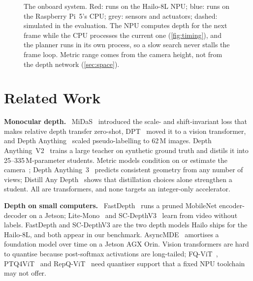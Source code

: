 \documentclass[conference]{IEEEtran}
\newcommand{\hailo}{Hailo-8L}
\newcommand{\rpi}{Raspberry Pi~5}
\newcommand{\dav}{Depth Anything~V2}
\newcommand{\keyline}[1]{\smallskip\noindent\textbf{#1}\ }
\begin{document}
\begin{figure}[t]
\caption{The onboard system. Red: runs on the \hailo{} NPU; blue: runs on the \rpi{}'s CPU; grey: sensors and actuators; dashed: simulated in the evaluation. The
NPU computes depth for the next frame while the CPU processes the current one (\cref{fig:timing}), and the planner runs in its
own process, so a slow search never stalls the frame loop. Metric range comes from the camera height, not from the depth
network (\cref{sec:space}).}
\label{fig:system}
\end{figure}

\section{Related Work}
\keyline{Monocular depth.} MiDaS~\cite{ranftl2022midas} introduced the scale- and shift-invariant loss that makes relative
depth transfer zero-shot, DPT~\cite{ranftl2021dpt} moved it to a vision transformer, and Depth Anything~\cite{yang2024da1}
scaled pseudo-labelling to 62\,M images. \dav{}~\cite{yang2024dav2} trains a large teacher on synthetic ground truth and
distils it into 25--335\,M-parameter students. Metric models condition on or estimate the camera~\cite{hu2024metric3dv2,
piccinelli2024unidepth,bochkovskiy2025depthpro}; Depth Anything~3~\cite{lin2025da3} predicts consistent geometry from any
number of views; Distill Any Depth~\cite{he2025distillanydepth} shows that distillation choices alone strengthen a student.
All are transformers, and none targets an integer-only accelerator.

\keyline{Depth on small computers.} FastDepth~\cite{wofk2019fastdepth} runs a pruned MobileNet encoder-decoder on a Jetson;
Lite-Mono~\cite{zhang2023litemono} and SC-DepthV3~\cite{sun2024scdepthv3} learn from video without labels. FastDepth and
SC-DepthV3 are the two depth models Hailo ships for the \hailo{}, and both appear in our benchmark. AsyncMDE~\cite{ma2026asyncmde}
amortises a foundation model over time on a Jetson AGX Orin. Vision transformers are hard to quantise because post-softmax
activations are long-tailed; FQ-ViT~\cite{lin2022fqvit}, PTQ4ViT~\cite{yuan2022ptq4vit} and RepQ-ViT~\cite{li2023repqvit}
need quantiser support that a fixed NPU toolchain may not offer.
\end{document}
